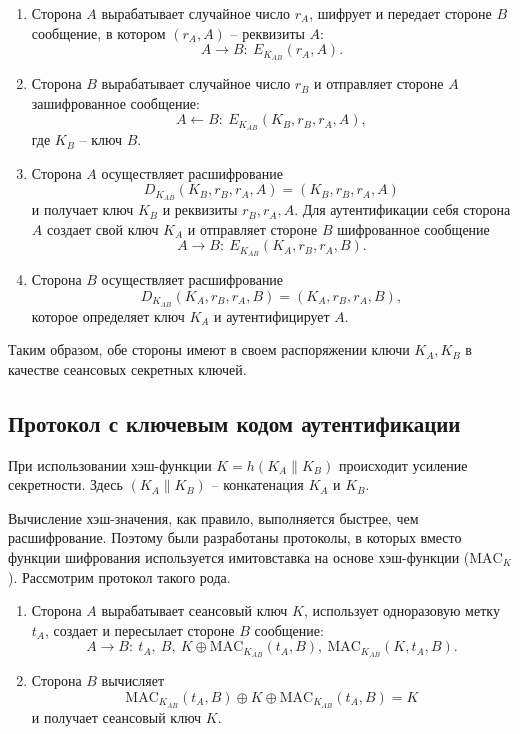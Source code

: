 \documentclass[10pt,a4paper]{book}
\newcommand{\MAC}{\textrm{MAC}}
\begin{document}
\begin{enumerate}
    \item Сторона $A$ вырабатывает случайное число $r_A$, шифрует и передает стороне $B$ сообщение, в котором  $(r_A, A)$ -- реквизиты $A$:
            \[ A \rightarrow B: ~ E_{K_{AB}}(r_A, A). \]
    \item Сторона $B$ вырабатывает случайное число $r_B$ и отправляет стороне $A$ зашифрованное сообщение:
            \[ A \leftarrow B: ~ E_{K_{AB}}(K_B, r_B, r_A, A), \]
        где $K_B$ -- ключ $B$.
     \item Сторона $A$ осуществляет расшифрование
            \[ D_{K_{AB}}(K_B, r_B, r_A, A) = (K_B, r_B, r_A, A) \]
        и получает ключ $K_B$ и реквизиты $r_B, r_A, A$. Для аутентификации себя сторона $A$ создает свой ключ $K_A$ и отправляет стороне $B$ шифрованное сообщение
            \[ A \rightarrow B: ~ E_{K_{AB}}(K_A, r_B, r_A, B). \]
     \item Сторона $B$ осуществляет расшифрование
            \[ D_{K_{AB}}(K_A, r_B, r_A, B) = (K_A, r_B, r_A, B), \]
        которое определяет ключ $K_A$ и аутентифицирует $A$.
\end{enumerate}

Таким образом, обе стороны имеют в своем распоряжении ключи $K_A, K_B$ в качестве сеансовых секретных ключей.


\subsection{Протокол с ключевым кодом аутентификации}

При использовании хэш-функции $K = h(K_{A} \| K_{B})$ происходит усиление секретности. Здесь $(K_{A} \| K_{B})$ -- конкатенация $K_{A} $ и $K_{B}$.


Вычисление хэш-значения, как правило, выполняется быстрее, чем расшифрование. Поэтому были разработаны протоколы, в которых вместо функции шифрования используется имитовставка на основе хэш-функции ($\MAC_K$). Рассмотрим протокол такого рода.
\begin{enumerate}
    \item Сторона $A$ вырабатывает сеансовый ключ $K$, использует одноразовую метку $t_{A}$, создает и пересылает стороне $B$ сообщение:
            \[ A \rightarrow B: ~ t_A, ~ B, ~ K \oplus \MAC_{K_{AB}}( t_A, B), ~ \MAC_{K_{AB}}(K, t_A, B). \]
    \item Сторона $B$ вычисляет
            \[ \MAC_{K_{AB}}(t_A, B) \oplus K \oplus \MAC_{K_{AB}}(t_A, B) = K \]
        и получает сеансовый ключ $K$.
\end{enumerate}
\end{document}
